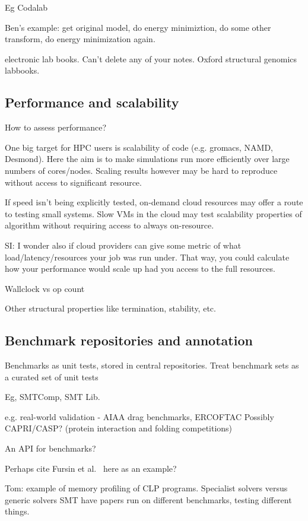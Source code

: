 \documentclass[conference]{IEEEtran}
\begin{document}
Eg Codalab

Ben's example: get original model, do energy minimiztion, do some other transform, do energy minimization again. 

electronic lab books. Can't delete any of your notes. Oxford structural genomics labbooks. 

\subsection{Performance and scalability}


{How to assess performance?}

One big target for HPC users is scalability of code (e.g. gromacs,
NAMD, Desmond). Here the aim is to make simulations run more efficiently
over large numbers of cores/nodes. Scaling results however may be 
hard to reproduce without access to significant resource.

If speed isn't being explicitly tested, on-demand cloud resources 
may offer a route to testing small systems. Slow VMs in the cloud
may test scalability properties of algorithm without requiring access
to always on-resource.

SI: I wonder also if cloud providers can give some metric of what
load/latency/resources your job was run under.  That way, you could
calculate how your performance would scale up had you access to the
full resources. 


Wallclock vs op count

Other structural properties like termination, stability, etc. 

\subsection{Benchmark repositories and annotation}


Benchmarks as unit tests, stored in central repositories. 
Treat benchmark sets as a curated set of unit tests

Eg, SMTComp, SMT Lib. 

e.g. real-world validation - AIAA drag benchmarks, ERCOFTAC
	Possibly CAPRI/CASP? (protein interaction and folding competitions)

An API for benchmarks? 

Perhaps cite Fursin et al.~\cite{fursin-et-al:2014} here as an example?

Tom: 
example of memory profiling of CLP programs. Specialist solvers versus 
generic solvers SMT have papers run on different benchmarks, testing different 
things. 
\end{document}
